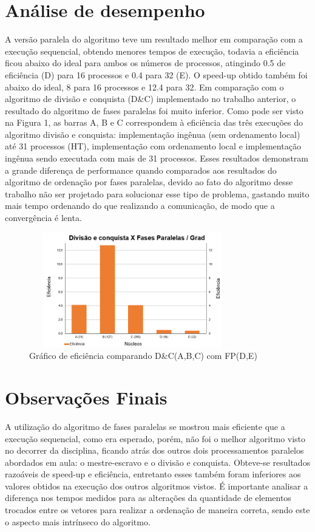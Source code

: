 \documentclass{article}
\begin{document}
\begin{multicols*}{2}
\section{Análise de desempenho}
A versão paralela do algoritmo teve um resultado melhor em comparação com a execução sequencial, obtendo menores tempos de execução, todavia a eficiência ficou abaixo do ideal para ambos os números de processos, atingindo 0.5 de eficiência (D) para 16 processos e 0.4 para 32 (E). O speed-up obtido também foi abaixo do ideal, 8 para 16 processos e 12.4 para 32. Em comparação com o algoritmo de divisão e conquista (D\&C) implementado no trabalho anterior, o resultado do algoritmo de fases paralelas foi muito inferior. Como pode ser visto na Figura 1, as barras A, B e C correspondem à eficiência das três execuções do algoritmo divisão e conquista: implementação ingênua (sem ordenamento local) até 31 processos (HT), implementação com ordenamento local e implementação ingênua sendo executada com mais de 31 processos. Esses resultados demonstram a grande diferença de performance quando comparados aos resultados do algoritmo de ordenação por fases paralelas, devido ao fato do algoritmo desse trabalho não ser projetado para solucionar esse tipo de problema, gastando muito mais tempo ordenando do que realizando a comunicação, de modo que a convergência é lenta.  
\begin{figure}[H]
            \centering
            \vspace{-1.1em}
            \includegraphics[width=9cm, height=5cm]{Capture.PNG}
            \vspace{-1.9em}
            \caption{Gráfico de eficiência comparando D\&C(A,B,C) com FP(D,E)}
            \vspace{-1.2em}
\end{figure}
\section{Observações Finais}
A utilização do algoritmo de fases paralelas se mostrou mais eficiente que a execução sequencial, como era esperado, porém, não foi o melhor algoritmo visto no decorrer da disciplina, ficando atrás dos outros dois processamentos paralelos abordados em aula: o mestre-escravo e o divisão e conquista. Obteve-se resultados razoáveis de speed-up e eficiência, entretanto esses também foram inferiores aos valores obtidos na execução dos outros algoritmos vistos. É importante analisar a diferença nos tempos medidos para as alterações da quantidade de elementos trocados entre os vetores para realizar a ordenação de maneira correta, sendo este o aspecto mais intrínseco do algoritmo.

\end{multicols*}

\newpage


\end{document}
